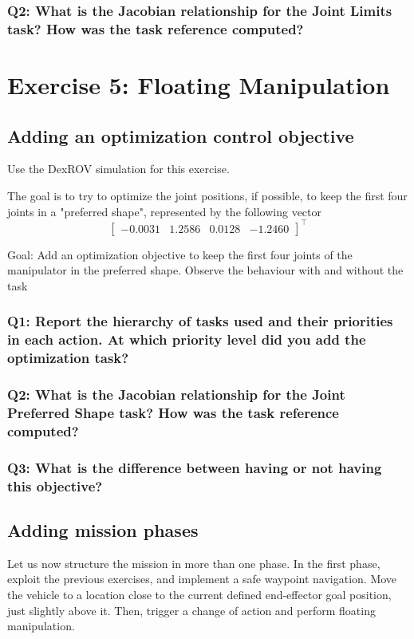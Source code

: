 \documentclass{article}
\begin{document}
\subsubsection{Q2: What is the Jacobian relationship for the Joint Limits task? How was the task reference computed?}

\clearpage
\section{Exercise 5: Floating Manipulation}
\subsection{Adding an optimization control objective}
Use the DexROV simulation for this exercise.

The goal is to try to optimize the joint positions, if possible, to keep the first four joints in a "preferred shape", represented by the following vector
\begin{displaymath}
\begin{bmatrix}-0.0031 & 1.2586 & 0.0128 & -1.2460 \end{bmatrix}^\top
\end{displaymath}

Goal: Add an optimization objective to keep the first four joints of the manipulator in the preferred shape. Observe the behaviour with and without the task

\subsubsection{Q1: Report the hierarchy of tasks used and their priorities in each action. At which priority level did you add the optimization task?}

\subsubsection{Q2: What is the Jacobian relationship for the Joint Preferred Shape task? How was the task reference computed?}

\subsubsection{Q3: What is the difference between having or not having this objective?}

\subsection{Adding mission phases}
Let us now structure the mission in more than one phase. In the first phase, exploit the previous exercises, and implement a safe waypoint navigation. Move the vehicle to a location close to the current defined end-effector goal position, just slightly above it. Then, trigger a change of action and perform floating manipulation.
\end{document}
